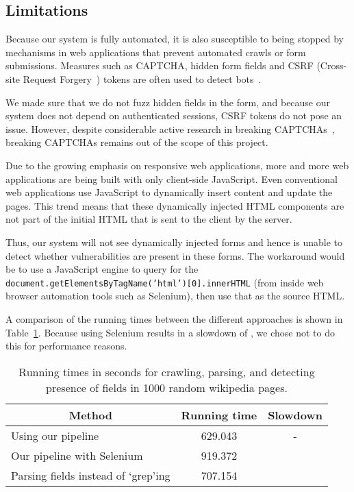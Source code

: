 \subsection[Limitations]{Limitations}
\label{limitations}
		Because our system is fully automated, it is also susceptible to being stopped by mechanisms in web applications that prevent automated crawls or form submissions. Measures such as CAPTCHA, hidden form fields and CSRF (Cross-site Request Forgery~\cite{csrf}) tokens are often used to detect bots~\cite{captchas3, captchas2}.

		We made sure that we do not fuzz hidden fields in the form, and because our system does not depend on authenticated sessions, CSRF tokens do not pose an issue. However, despite considerable active research in breaking CAPTCHAs~\cite{captchas2, captchas}, breaking CAPTCHAs remains out of the scope of this project. 
		
	   Due to the growing emphasis on responsive web applications, more and more web applications are being built with only client-side JavaScript. Even conventional web applications use JavaScript to dynamically insert content and update the pages. This trend means that these dynamically injected HTML components are not part of the initial HTML that is sent to the client by the server.

		Thus, our system will not see dynamically injected forms and hence is unable to detect whether \ehi vulnerabilities are present in these forms. The workaround would be to use a JavaScript engine to query for the \texttt{document.getElementsByTagName('html')[0].innerHTML} (from inside web browser automation tools such as Selenium), then use that as the source HTML. 
		
		A comparison of the running times between the different approaches is shown in Table~\ref{tab:perf}. Because using Selenium results in a slowdown of \slowSelenium, we chose not to do this for performance reasons. 
		
		\begin{table}
			\centering
			\scriptsize
			\begin{tabular}{|p{4cm}|c|c|}
				\hline
				\multicolumn{1}{|c}{\textbf{Method}} &
				\multicolumn{1}{|c|}{\textbf{Running time}} &
				\multicolumn{1}{|c|}{\textbf{Slowdown}}
				\\
				\hline
				\centering Using our pipeline & 629.043 & - \\
				\hline
				\centering Our pipeline with Selenium & 919.372 & \slowSelenium \\
				\hline				
				\centering Parsing \email fields instead of `grep'ing& 707.154 & \slowParse \\								
				\hline
			\end{tabular}
			\caption[\titlecap{}]{Running times in seconds for crawling, parsing, and detecting presence of \email fields in 1000 random wikipedia pages.}
			\label{tab:perf}
		\end{table}

